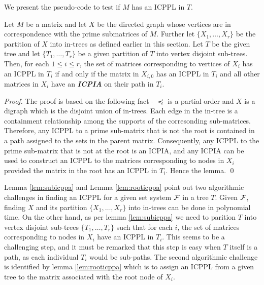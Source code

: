 \documentclass{fsttcs}
\def\cF{{\cal F}}
\begin{document}
\noindent 
We present the pseudo-code to test if $M$ has an ICPPL in $T$. 
\begin{lemma} \label{lem:rooticppa}
Let $M$ be a matrix and let $X$ be the directed graph whose vertices
are in correspondence with the prime submatrices of $M$.  Further let
$\{X_1,\ldots,X_r\}$ be the partition of $X$ into in-trees as defined
earlier in this section. 
Let $T$ be the given tree and let $\{T_1, \ldots, T_r\}$ be a given
partition of $T$ into vertex disjoint sub-trees. 
Then, for each $1 \leq i \leq r$, the set of matrices corresponding to
vertices of $X_i$ has an ICPPL in $T_i$ if and only if the matrix in
$X_{i,0}$ has an ICPPL in $T_i$ and all other matrices in $X_i$ have
an {\bf {\em ICPIA}} on their path in $T_i$. 
\end{lemma}
\begin{proof}
The proof is based on the following fact - $\preccurlyeq$ is a partial
order and $X$ is a digraph which is the disjoint 
union of in-trees.  Each edge in the in-tree is a containment
relationship among the supports of the corresonding
sub-matrices. Therefore, any ICPPL to a prime sub-matrix that is not
the root is contained in a path assigned to the sets in the parent
matrix.  Consequently, any ICPPL to the prime sub-matrix that is not
at the root is an ICPIA, and any ICPIA can be used to construct an
ICPPL to the matrices corresponding to nodes in $X_i$ provided the
matrix in the root has an ICPPL in $T_i$.   Hence the lemma. \qed
\end{proof}
Lemma \ref{lem:subicppa} and Lemma \ref{lem:rooticppa} point out two
algorithmic challenges in finding an ICPPL for a given set system
$\cF$ in a tree $T$.  Given $\cF$, finding $X$ and its partition
$\{X_1,\ldots,X_r\}$ into in-trees can be done in polynomial time.  On
the other hand, as per lemma \ref{lem:subicppa} we need to parition
$T$ into vertex disjoint sub-trees $\{T_1, \ldots, T_r\}$ such that
for each $i$, the set of matrices corresponding  to nodes in $X_i$
have an ICPPL in $T_i$.  This seems to be a challenging step, and it
must be remarked that this step is easy when $T$ itself is a path, as
each individual $T_i$ would be sub-paths.  The second algorithmic
challenge is identified by lemma \ref{lem:rooticppa} which is to
assign an ICPPL from a given tree to the matrix associated with the
root node of $X_i$. 
  
\end{document}
